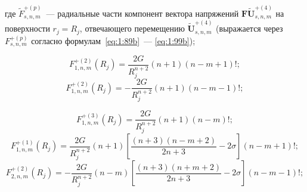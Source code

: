 \noindent где $\tilde F_{s,n,m}^{+(p)}$~--- радиальные части компонент вектора напряжений $\mathbf{F\tilde U}_{s,n,m}^{+(4)}$ на поверхности $r_j=R_j$, отвечающего перемещению $\mathbf{\tilde U}_{s,n,m}^{+(4)}$ (выражается через $F_{s,n,m}^{+(p)}$ согласно формулам~\eqref{eq:1:89b}~--- \eqref{eq:1:99b}); 

\begin{equation}
F_{1,n,m}^{ + (2)}(R_j) = \frac{{2G}}{{{R_j^{n + 2}}}}(n + 1)(n - m + 1)!;
\label{eq:8:12}
\end{equation}
\begin{equation}
F_{1,n,m}^{ + (2)}(R_j) =  - \frac{{2G}}{{{R_j^{n + 2}}}}(n + 1)(n - m - 1)!;
\label{eq:8:12a}
\end{equation}

\begin{equation}
F_{1,n,m}^{ + (3)}(R_j) = \frac{{2G}}{{{R_j^{n + 2}}}}(n + 1)(n - m)!;
\label{eq:8:13a}
\end{equation}
\begin{equation}
F_{1,n,m}^{ + (1)}(R_j) = \frac{{2G}}{{{R_j^{n + 2}}}}(n + 1)\left[ {\frac{{(n + 3)(n - m + 2)}}{{2n + 3}} - 2\sigma } \right](n - m + 1)!;
\label{eq:8:13b}
\end{equation}
\begin{equation}
F_{2,n,m}^{ + (2)}(R_j) = - \frac{{2G}}{{{R_j^{n + 2}}}}(n - m)\left[ {\frac{{(n + 3)(n + m + 2)}}{{2n + 3}} - 2\sigma } \right](n - m - 1)!;
\label{eq:8:13c}
\end{equation}

